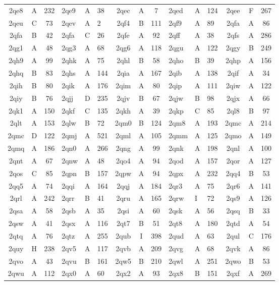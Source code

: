 \begin{longtable}{|c|c|c| a|a|a| c|c|c| a|a|a| c|c|c|}
2qe8 & A & 232 & 2qe9 & A & 38 & 2qec & A & 7 & 2qed & A & 124 & 2qee & F & 267\\
2qeu & C & 73 & 2qev & A & 2 & 2qf4 & B & 111 & 2qf9 & A & 89 & 2qfa & A & 86\\
2qfa & B & 42 & 2qfa & C & 26 & 2qfe & A & 92 & 2qff & A & 38 & 2qfs & A & 286\\
2qg1 & A & 48 & 2qg3 & A & 68 & 2qg6 & A & 118 & 2qgu & A & 122 & 2qgy & B & 249\\
2qh9 & A & 99 & 2qhk & A & 75 & 2qhl & B & 58 & 2qho & B & 39 & 2qhp & A & 156\\
2qhq & B & 83 & 2qhs & A & 144 & 2qia & A & 167 & 2qib & A & 138 & 2qif & A & 34\\
2qih & B & 80 & 2qik & A & 176 & 2qim & A & 80 & 2qip & A & 111 & 2qiw & A & 122\\
2qiy & B & 76 & 2qjj & D & 235 & 2qjv & B & 67 & 2qjw & B & 98 & 2qjx & A & 66\\
2qk1 & A & 150 & 2qkf & C & 135 & 2qkh & A & 39 & 2qkp & C & 85 & 2ql8 & B & 97\\
2qlt & A & 153 & 2qlw & B & 72 & 2qm0 & B & 124 & 2qm8 & A & 193 & 2qmc & A & 214\\
2qmc & D & 122 & 2qmj & A & 521 & 2qml & A & 105 & 2qmm & A & 125 & 2qmo & A & 149\\
2qmq & A & 186 & 2qn0 & A & 266 & 2qng & A & 99 & 2qnk & A & 198 & 2qnl & A & 100\\
2qnt & A & 67 & 2qnw & A & 48 & 2qo4 & A & 94 & 2qod & A & 157 & 2qor & A & 127\\
2qos & C & 85 & 2qpn & B & 157 & 2qpw & A & 94 & 2qpx & A & 232 & 2qq4 & B & 53\\
2qq5 & A & 74 & 2qqi & A & 164 & 2qqj & A & 184 & 2qr3 & A & 75 & 2qr6 & A & 141\\
2qrl & A & 242 & 2qrr & B & 41 & 2qru & A & 165 & 2qrw & I & 72 & 2qs9 & A & 126\\
2qsa & A & 58 & 2qsb & A & 35 & 2qsi & A & 60 & 2qsk & A & 56 & 2qsq & B & 33\\
2qsw & A & 41 & 2qsx & A & 116 & 2qt7 & B & 51 & 2qt8 & A & 180 & 2qtd & A & 54\\
2qtq & A & 76 & 2qtz & A & 255 & 2qub & I & 398 & 2qud & A & 63 & 2qul & C & 176\\
2quy & H & 238 & 2qv5 & A & 117 & 2qvb & A & 209 & 2qvg & A & 68 & 2qvk & A & 86\\
2qvo & A & 43 & 2qvu & B & 161 & 2qw5 & B & 210 & 2qwl & A & 251 & 2qwo & B & 53\\
2qwu & A & 112 & 2qx0 & A & 60 & 2qx2 & A & 93 & 2qx8 & B & 151 & 2qxf & A & 269\\

\end{longtable}
